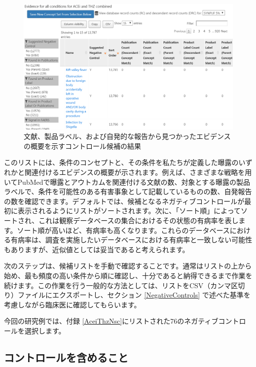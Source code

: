 \documentclass[
  11pt]{book}
\theoremstyle{definition}
\theoremstyle{definition}
\theoremstyle{definition}
\theoremstyle{definition}
\theoremstyle{remark}
\begin{document}
\begin{figure}

{\centering \includegraphics[width=1\linewidth]{images/MethodValidity/candidateNcs} 

}

\caption{文献、製品ラベル、および自発的な報告から見つかったエビデンスの概要を示すコントロール候補の結果}\label{fig:candidateNcs}
\end{figure}

このリストには、条件のコンセプトと、その条件を私たちが定義した曝露のいずれかと関連付けるエビデンスの概要が示されます。例えば、さまざまな戦略を用いてPubMedで曝露とアウトカムを関連付ける文献の数、対象とする曝露の製品ラベルで、条件を可能性のある有害事象として記載しているものの数、自発報告の数を確認できます。デフォルトでは、候補となるネガティブコントロールが最初に表示されるようにリストがソートされます。次に、「ソート順」によってソートされ、これは観察データベースの集合におけるその状態の有病率を表します。ソート順が高いほど、有病率も高くなります。これらのデータベースにおける有病率は、調査を実施したいデータベースにおける有病率と一致しない可能性もありますが、近似値としては妥当であると考えられます。

次のステップは、候補リストを手動で確認することです。通常はリストの上から始め、最も頻度の高い条件から順に確認し、十分であると納得できるまで作業を続けます。この作業を行う一般的な方法としては、リストをCSV（カンマ区切り）ファイルにエクスポートし、セクション \ref{NegativeControls} で述べた基準を考慮しながら臨床医に確認してもらいます。

今回の研究例では、付録 \ref{AceiThzNsc}にリストされた76のネガティブコントロールを選択します。

\subsection{コントロールを含めること}\label{ux30b3ux30f3ux30c8ux30edux30fcux30ebux3092ux542bux3081ux308bux3053ux3068}
\end{document}
